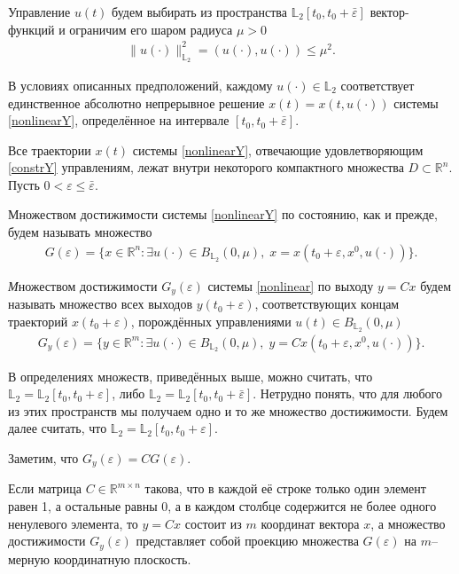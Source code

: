\documentclass[../main.tex]{subfiles}
\begin{document}
 Управление $u(t)$ будем выбирать из
пространства $\mathbb{L}_2[t_0,t_0+\bar{\varepsilon}]$ вектор-функций и ограничим его шаром радиуса $ \mu > 0 $
\begin{gather}\label{constrY}
	\lVert u(\cdot)\rVert^2_{\mathbb{L}_2} = \left(u(\cdot),u(\cdot) \right) \leqslant \mu^2.
\end{gather}

В условиях описанных предположений, каждому $ u(\cdot) \in \mathbb{L}_2 $ соответствует единственное абсолютно непрерывное решение $ x(t)=x(t,u(\cdot)) $ системы \eqref{nonlinearY}, определённое на интервале $ [t_0,t_0+\bar{\varepsilon}] $.

Все траектории $ x(t) $ системы \eqref{nonlinearY}, отвечающие удовлетворяющим \eqref{constrY} управлениям,  лежат внутри некоторого компактного множества $ D \subset \mathbb{R}^n $. Пусть $ 0 <  \varepsilon \leqslant \bar{\varepsilon} $. 

Множеством достижимости системы \eqref{nonlinearY} по состоянию, как и прежде, будем называть множество \begin{gather*}
	G(\varepsilon)=\{x\in \mathbb{R}^n:\exists u(\cdot)\in B_{\mathbb{L}_2}(0,\mu),\; x=x(t_0+\varepsilon,x^0,u(\cdot))\}.
\end{gather*}


\begin{definition}
	{\textit Множеством достижимости $G_y(\varepsilon)$ системы \eqref{nonlinear} по выходу} $ y = C x $ будем называть множество всех выходов $ y(t_0+\varepsilon) $,
	соответствующих концам траекторий $ x(t_0+\varepsilon) $, порождённых управлениями $ u(t) \in B_{\mathbb{L}_2}(0,\mu)$
	\begin{gather*}
		G_y(\varepsilon)=\{y\in \mathbb{R}^m:\exists u(\cdot)\in B_{\mathbb{L}_2}(0,\mu),\; y=Cx(t_0+\varepsilon,x^0,u(\cdot))\}.
	\end{gather*}
\end{definition}

В определениях множеств, приведённых выше, можно считать, что $ \mathbb{L}_2 =\mathbb{L}_2[t_0,t_0+\varepsilon] $, либо  $ \mathbb{L}_2=\mathbb{L}_2[t_0,t_0+\bar{\varepsilon}] $. Нетрудно понять, что для любого из этих пространств мы получаем одно и то же множество достижимости. Будем далее считать, что $ \mathbb{L}_2 =\mathbb{L}_2[t_0,t_0+\varepsilon] $.
	
Заметим, что  $ G_y(\varepsilon) = C G(\varepsilon) $.	
	
Если матрица $ C \in \mathbb{R}^{m \times n} $ такова, что в каждой её строке только один элемент равен 1, а остальные равны 0, а в каждом столбце содержится не более одного ненулевого элемента, то $ y=Cx $ состоит из $ m$ координат вектора $ x $, а  множество достижимости $G_y(\varepsilon)$ представляет собой проекцию множества $ G(\varepsilon) $ на $m$--мерную координатную плоскость.
\end{document}
